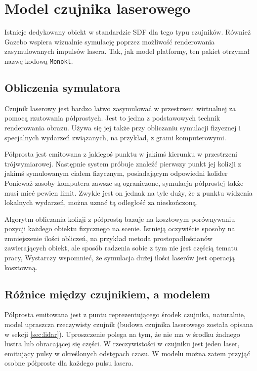 \chapter{Model czujnika laserowego}
Istnieje dedykowany obiekt w standardzie SDF dla tego typu czujników.
Również Gazebo wspiera wizualnie symulację poprzez możliwość renderowania zasymulowanych impulsów lasera.
Tak, jak model platformy, ten pakiet otrzymał nazwę kodową \texttt{Monokl}.

\section{Obliczenia symulatora}
	Czujnik laserowy jest bardzo łatwo zasymulować w przestrzeni wirtualnej za pomocą rzutowania półprostych.
	Jest to jedna z podstawowych technik renderowania obrazu.
	Używa się jej także przy obliczaniu symulacji fizycznej i specjalnych wydarzeń związanych, na przykład, z grami komputerowymi.

	Półprosta jest emitowana z jakiegoś punktu w jakimś kierunku w przestrzeni trójwymiarowej.
	Następnie system próbuje znaleźć pierwszy punkt jej kolizji z jakimś symulowanym ciałem fizycznym, posiadającym odpowiedni kolider 
	Ponieważ zasoby komputera zawsze są ograniczone, symulacja półprostej także musi mieć pewien limit. 
	Zwykle jest on jednak na tyle duży, że z punktu widzenia lokalnych wydarzeń, można uznać tą odległość za nieskończoną.

	Algorytm obliczania kolizji z półprostą bazuje na kosztowym porównywaniu pozycji każdego obiektu fizycznego na scenie.
	Istnieją oczywiście sposoby na zmniejszenie ilości obliczeń, na przykład metoda prostopadłościanów zawierających obiekt, ale sposób radzenia sobie z tym nie jest
	częścią tematu pracy,
	Wystarczy wspomnieć, że symulacja dużej ilości laserów jest operacją kosztowną.

\section{Różnice między czujnikiem, a modelem}
	Półprosta emitowana jest z puntu reprezentującego środek czujnika, naturalnie, model upraszcza rzeczywisty czujnik (budowa czujnika laserowego została opisana w sekcji \ref{sec:lidar}).
	Uproszczenie polega na tym, że nie ma w środku żadnego lustra lub obracającej się części. 
	W rzeczywistości w czujniku jest jeden laser, emitujący pulsy w określonych odstępach czasu.
	W modelu można zatem przyjąć osobne półproste dla każdego pulsu lasera.

